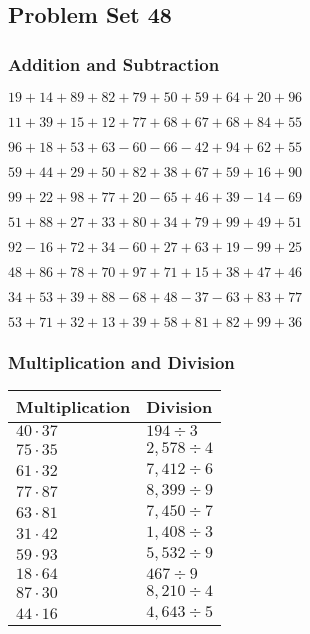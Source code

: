 \hypertarget{problem-set-48}{%
\subsection{Problem Set 48}\label{problem-set-48}}

\hypertarget{addition-and-subtraction}{%
\subsubsection{Addition and
Subtraction}\label{addition-and-subtraction}}

\(19+14+89+82+79+50+59+64+20+96\)

\(11+39+15+12+77+68+67+68+84+55\)

\(96+18+53+63-60-66-42+94+62+55\)

\(59+44+29+50+82+38+67+59+16+90\)

\(99+22+98+77+20-65+46+39-14-69\)

\(51+88+27+33+80+34+79+99+49+51\)

\(92-16+72+34-60+27+63+19-99+25\)

\(48+86+78+70+97+71+15+38+47+46\)

\(34+53+39+88-68+48-37-63+83+77\)

\(53+71+32+13+39+58+81+82+99+36\)

\hypertarget{multiplication-and-division}{%
\subsubsection{Multiplication and
Division}\label{multiplication-and-division}}

\begin{longtable}[]{@{}ll@{}}
\toprule
Multiplication & Division\tabularnewline
\midrule
\endhead
\(40\cdot37\) & \(194÷3\)\tabularnewline
\(75\cdot35\) & \(2,578÷4\)\tabularnewline
\(61\cdot32\) & \(7,412÷6\)\tabularnewline
\(77\cdot87\) & \(8,399÷9\)\tabularnewline
\(63\cdot81\) & \(7,450÷7\)\tabularnewline
\(31\cdot42\) & \(1,408÷3\)\tabularnewline
\(59\cdot93\) & \(5,532÷9\)\tabularnewline
\(18\cdot64\) & \(467÷9\)\tabularnewline
\(87\cdot30\) & \(8,210÷4\)\tabularnewline
\(44\cdot16\) & \(4,643÷5\)\tabularnewline
\bottomrule
\end{longtable}

